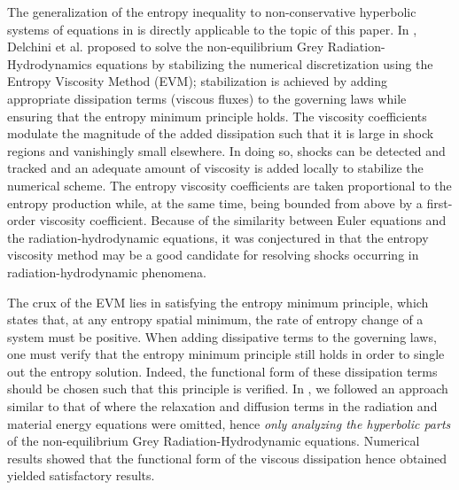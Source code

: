 \documentclass[times,doublespace]{fldauth}%
\begin{document}
%
%
The generalization of the entropy inequality to non-conservative hyperbolic systems of equations in \cite{lefloch_1988} is directly applicable to
the topic of this paper. In \cite{our_jcp_radhy_paper}, Delchini et al. proposed to solve the non-equilibrium Grey Radiation-Hydrodynamics 
equations by stabilizing the numerical discretization using the Entropy Viscosity Method (EVM); 
stabilization is achieved by adding appropriate dissipation terms (viscous fluxes) to the governing laws while ensuring 
that the entropy minimum principle holds. 
The viscosity coefficients modulate the magnitude of the added dissipation such that it is large in shock regions 
and vanishingly small elsewhere. In doing so, shocks can be detected and tracked and an adequate amount of viscosity 
is added locally to stabilize the numerical scheme. 
The entropy viscosity coefficients are taken proportional to the entropy production while, at the same time, 
being bounded from above by a first-order viscosity coefficient.
Because of the similarity between Euler equations and the radiation-hydrodynamic equations, it was conjectured in 
\cite{our_jcp_radhy_paper} that the entropy 
viscosity method may be a good candidate for resolving shocks occurring in radiation-hydrodynamic phenomena.

The crux of the EVM lies in satisfying the entropy minimum principle, which states that, at any entropy spatial 
minimum, the rate of entropy change of a system must be positive. When
adding dissipative terms to the governing laws, one must verify that the entropy minimum principle still holds in 
order to single out the entropy solution. Indeed, the functional form of these dissipation terms
should be chosen such that this principle is verified. In \cite{our_jcp_radhy_paper}, we followed an approach 
similar to that of \cite{Balsara, LowrieMorel} 
where the relaxation and diffusion terms in the radiation and material energy equations were omitted, hence {\it only analyzing the hyperbolic parts} of 
the non-equilibrium Grey Radiation-Hydrodynamic equations. Numerical results showed that the functional form of the 
viscous dissipation hence obtained yielded satisfactory results. 
\end{document}
